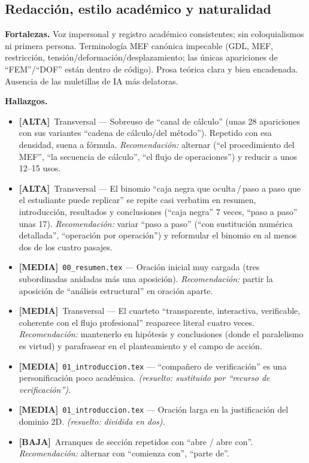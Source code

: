 \documentclass[11pt,a4paper]{article}
\newcommand{\sevalta}{\textcolor{cAlta}{\textbf{[ALTA]}}}
\newcommand{\sevmedia}{\textcolor{cMedia}{\textbf{[MEDIA]}}}
\newcommand{\sevbaja}{\textcolor{cBaja}{\textbf{[BAJA]}}}
\newcommand{\fileref}[1]{\texttt{\small #1}}
\begin{document}
\subsection{Redacción, estilo académico y naturalidad}

\textbf{Fortalezas.} Voz impersonal y registro académico consistentes; sin coloquialismos ni primera
persona. Terminología MEF canónica impecable (GDL, MEF, restricción, tensión/deformación/desplazamiento;
las únicas apariciones de ``FEM''/``DOF'' están dentro de código). Prosa teórica clara y bien
encadenada. Ausencia de las muletillas de IA más delatoras.

\textbf{Hallazgos.}
\begin{itemize}
  \item \sevalta\ Transversal — Sobreuso de ``canal de cálculo'' (unas 28 apariciones con sus variantes ``cadena de cálculo/del método''). Repetido con esa densidad, suena a fórmula. \textit{Recomendación:} alternar (``el procedimiento del MEF'', ``la secuencia de cálculo'', ``el flujo de operaciones'') y reducir a unos 12--15 usos.
  \item \sevalta\ Transversal — El binomio ``caja negra que oculta\,/\,paso a paso que el estudiante puede replicar'' se repite casi verbatim en resumen, introducción, resultados y conclusiones (``caja negra'' 7 veces, ``paso a paso'' unas 17). \textit{Recomendación:} variar ``paso a paso'' (``con sustitución numérica detallada'', ``operación por operación'') y reformular el binomio en al menos dos de los cuatro pasajes.
  \item \sevmedia\ \fileref{00\_resumen.tex} — Oración inicial muy cargada (tres subordinadas anidadas más una aposición). \textit{Recomendación:} partir la aposición de ``análisis estructural'' en oración aparte.
  \item \sevmedia\ Transversal — El cuarteto ``transparente, interactiva, verificable, coherente con el flujo profesional'' reaparece literal cuatro veces. \textit{Recomendación:} mantenerlo en hipótesis y conclusiones (donde el paralelismo es virtud) y parafrasear en el planteamiento y el campo de acción.
  \item \sevmedia\ \fileref{01\_introduccion.tex} — ``compañero de verificación'' es una personificación poco académica. \textit{(resuelto: sustituido por ``recurso de verificación'').}
  \item \sevmedia\ \fileref{01\_introduccion.tex} — Oración larga en la justificación del dominio 2D. \textit{(resuelto: dividida en dos).}
  \item \sevbaja\ Arranques de sección repetidos con ``abre / abre con''. \textit{Recomendación:} alternar con ``comienza con'', ``parte de''.

\end{itemize}
\end{document}
